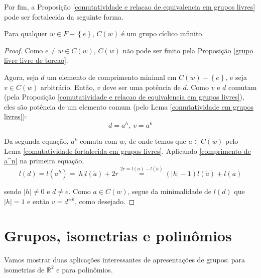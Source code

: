     	\par\vspace{0.3cm} Por fim, a 
    	Proposição \eqref{comutatividade e relacao de equivalencia em grupos livres} pode ser 
    	fortalecida da seguinte forma.
    	\begin{theorem}
    	\label{centralizadores em grupos livres}
    		Para qualquer $w\in F - \left\{ e \right\}$, $C(w)$ é um grupo cíclico infinito.
    	\end{theorem}
    	\begin{proof}
    		Como $e\neq w\in C(w)$, $C(w)$ não pode ser finito pela 
    		Proposição \eqref{grupo livre livre de torcao}.
    		
    		\par\vspace{0.3cm} Agora, seja $d$ um elemento de comprimento minimal em 
    		$C(w) - \left\{ e \right\}$, e seja $v\in C(w)$ arbitrário. Então, $v$ deve ser uma potência de $d$.
    		Como $v$ e $d$ comutam (pela 
    		Proposição \eqref{comutatividade e relacao de equivalencia em grupos livres}), eles são potência 
    		de um elemento comum (pelo Lema \eqref{comutatividade em grupos livres}):
    		\begin{equation*}
    		    d = a^h, \ v = a^k
    		\end{equation*}
    		\par\vspace{0.3cm} Da segunda equação, $a^k$ comuta com $w$, de onde temos que $a\in C(w)$ 
    		pelo Lema \eqref{comutatividade fortalecida em grupos livres}. Aplicando \eqref{comprimento de a^n} 
    		na primeira equação, 
    		\begin{equation*}
    		    l(d) = l(a^h) 
    		    = |h|l(\check{a}) + 2r \stackrel{2r = l(a) - l(\check{a})}{=} (|h| - 1)l(\check{a}) + l(a)
    		\end{equation*}
    		\par\vspace{0.3cm} sendo $|h|\neq 0$ e $d\neq e$. Como $a\in C(w)$, segue da minimalidade de 
    		$l(d)$ que $|h| = 1$ e então $v = d^{\pm k}$, como desejado.
    	\end{proof}
	\section{Grupos, isometrias e polinômios}
    	Vamos mostrar duas aplicações interessantes de apresentações de grupos: para isometrias 
    	de $\mathbb{R}^2$ e para polinômios.
    	
